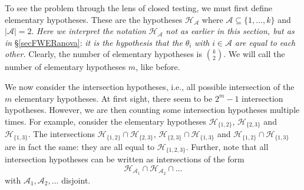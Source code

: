 \documentclass[11pt]{article}
\theoremstyle{plain}
\theoremstyle{definition}
\newcommand{\A}{\mathcal{A}}
\newcommand{\Hy}{\mathcal{H}}
\begin{document}
To see the problem through the lens of closed testing, we must first define elementary hypotheses. These are the hypotheses
$\Hy_{\A}$ where $\A\subseteq\{1,...,k\}$ and $|\A|=2$. \emph{Here we interpret the notation} $\Hy_{\A}$ \emph{not as earlier in this section, but as in}  \S\ref{secFWERanova}: \emph{it  is the hypothesis that the} $\theta_i$ \emph{with} $i\in \A$ \emph{are equal to each other.} Clearly, the number of elementary hypotheses is $\binom{k}{2}$. We will call the number of elementary hypotheses $m$, like before. 

We now consider the intersection hypotheses, i.e., all possible intersection of the $m$ elementary hypotheses. At first sight, there seem to be $2^m-1$ intersection hypotheses. However, we are then counting some intersection hypotheses multiple times. For example, consider the elementary hypotheses $\Hy_{\{1,2\}}$,  $\Hy_{\{2,3\}}$ and  $\Hy_{\{1,3\}}$. The intersections  $\Hy_{\{1,2\}}\cap \Hy_{\{2,3\}}$, $\Hy_{\{2,3\}}\cap\Hy_{\{1,3\}}$ and $\Hy_{\{1,2\}}\cap\Hy_{\{1,3\}}$ are in fact the same: they are all equal to $\Hy_{\{1,2,3\}}$. Further, note that  all intersection hypotheses can be written as intersections of the form $$\Hy_{\A_1}\cap\Hy_{\A_2}\cap...$$ with  $\A_1, \A_2,...$ disjoint. 
\end{document}
